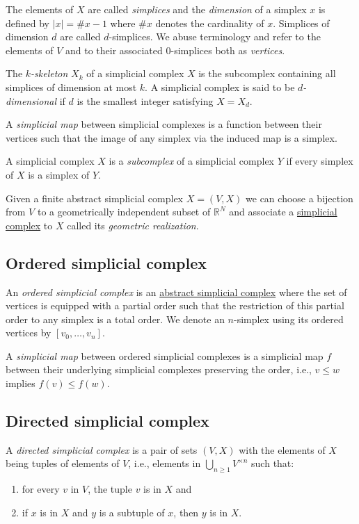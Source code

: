 \documentclass{amsart}
\begin{document}
	The elements of $X$ are called \textit{simplices} and the \textit{dimension} of a simplex $x$ is defined by $|x| = \# x - 1$ where $\# x$ denotes the cardinality of $x$. Simplices of dimension $d$ are called $d$-simplices. We abuse terminology and refer to the elements of $V$ and to their associated $0$-simplices both as \textit{vertices}.
	
	The \textit{$k$-skeleton }$X_k$ of a simplicial complex $X$ is the subcomplex containing all simplices of dimension at most $k$. A simplicial complex is said to be \textit{$d$-dimensional} if $d$ is the smallest integer satisfying $X = X_d$.
	
	A \textit{simplicial map} between simplicial complexes is a function between their vertices such that the image of any simplex via the induced map is a simplex.
	
	A simplicial complex $X$ is a \textit{subcomplex} of a simplicial complex $Y$ if every simplex of $X$ is a simplex of $Y$.
	
	Given a finite abstract simplicial complex $X = (V, X)$ we can choose a bijection from $V$ to a geometrically independent subset of $\mathbb R^N$ and associate a \hyperref[simplicial complex]{simplicial complex} to $X$ called its \textit{geometric realization}.
	
	\subsection*{Ordered simplicial complex} \label{ordered simplical complex}
	
	An \textit{ordered simplicial complex} is an \hyperref[abstract simplicial complex]{abstract simplicial complex} where the set of vertices is equipped with a partial order such that the restriction of this partial order to any simplex is a total order. We denote an $n$-simplex using its ordered vertices by $[v_0, \dots, v_n]$.
	
	A \textit{simplicial map} between ordered simplicial complexes is a simplicial map $f$ between their underlying simplicial complexes preserving the order, i.e., $v \leq w$ implies $f(v) \leq f(w)$.
	
	\subsection*{Directed simplicial complex} \label{directed simplicial complex}
	
	A \textit{directed simplicial complex} is a pair of sets $(V, X)$ with the elements of $X$ being tuples of elements of $V$, i.e., elements in $\bigcup_{n\geq1} V^{\times n}$ such that: 
	\begin{enumerate}
		\item for every $v$ in $V$, the tuple $v$ is in $X$ and
		\item if $x$ is in $X$ and $y$ is a subtuple of $x$, then $y$ is in $X$. 
	\end{enumerate}
	
\end{document}

